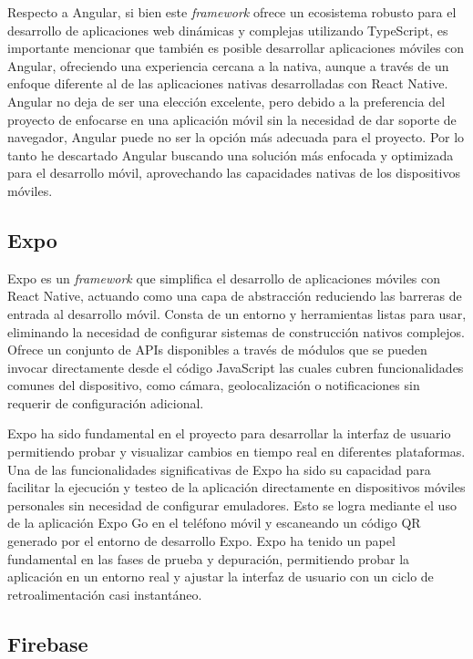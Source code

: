 Respecto a Angular, si bien este \textit{framework} ofrece un ecosistema robusto para el desarrollo de aplicaciones web dinámicas y complejas utilizando TypeScript, es importante mencionar que también es posible desarrollar aplicaciones móviles con Angular, ofreciendo una experiencia cercana a la nativa, aunque a través de un enfoque diferente al de las aplicaciones nativas desarrolladas con React Native. 
Angular no deja de ser una elección excelente, pero debido a la preferencia del proyecto de enfocarse en una aplicación móvil sin la necesidad de dar soporte de navegador, Angular puede no ser la opción más adecuada para el proyecto.
Por lo tanto he descartado Angular buscando una solución más enfocada y optimizada para el desarrollo móvil, aprovechando las capacidades nativas de los dispositivos móviles.


\subsection{Expo}

Expo es un \textit{framework} que simplifica el desarrollo de aplicaciones móviles con React Native, actuando como una capa de abstracción reduciendo las barreras de entrada al desarrollo móvil. 
Consta de un entorno y herramientas listas para usar, eliminando la necesidad de configurar sistemas de construcción nativos complejos. 
Ofrece un conjunto de APIs disponibles a través de módulos que se pueden invocar directamente desde el código JavaScript las cuales cubren funcionalidades comunes del dispositivo, como cámara, geolocalización o notificaciones sin requerir de configuración adicional. 

Expo ha sido fundamental en el proyecto para desarrollar la interfaz de usuario permitiendo probar y visualizar cambios en tiempo real en diferentes plataformas.
Una de las funcionalidades significativas de Expo ha sido su capacidad para facilitar la ejecución y testeo de la aplicación directamente en dispositivos móviles personales sin necesidad de configurar emuladores. Esto se logra mediante el uso de la aplicación Expo Go en el teléfono móvil y escaneando un código QR generado por el entorno de desarrollo Expo.
Expo ha tenido un papel fundamental en las fases de prueba y depuración, permitiendo probar la aplicación en un entorno real y ajustar la interfaz de usuario con un ciclo de retroalimentación casi instantáneo.


\subsection{Firebase}

